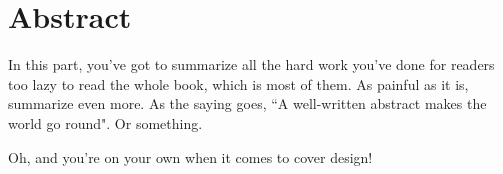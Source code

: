 \chapter{Abstract}

In this part, you've got to summarize all the hard work you've done for readers
too lazy to read the whole book, which is most of them. As painful as it is,
summarize even more. As the saying goes, ``A well-written abstract makes the world go round". Or something.

Oh, and you're on your own when it comes to cover design!